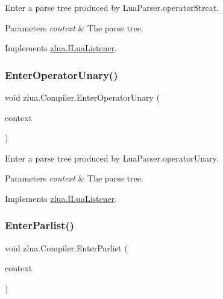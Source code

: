 Enter a parse tree produced by Lua\+Parser.\+operator\+Strcat. 


\begin{DoxyParams}{Parameters}
{\em context} & The parse tree.\\
\hline
\end{DoxyParams}


Implements \mbox{\hyperlink{interfacezlua_1_1_i_lua_listener_a9fbd70b572afa004220c8cdcaceb641a}{zlua.\+I\+Lua\+Listener}}.

\mbox{\label{classzlua_1_1_compiler_a1c085d48a4bc63b7b42cb8763f643bb2}} 
\subsubsection{\texorpdfstring{Enter\+Operator\+Unary()}{EnterOperatorUnary()}}
{\footnotesize\ttfamily void zlua.\+Compiler.\+Enter\+Operator\+Unary (\begin{DoxyParamCaption}\item[{\mbox{[}\+Not\+Null\mbox{]} \mbox{\hyperlink{classzlua_1_1_lua_parser_1_1_operator_unary_context}{Lua\+Parser.\+Operator\+Unary\+Context}}}]{context }\end{DoxyParamCaption})}



Enter a parse tree produced by Lua\+Parser.\+operator\+Unary. 


\begin{DoxyParams}{Parameters}
{\em context} & The parse tree.\\
\hline
\end{DoxyParams}


Implements \mbox{\hyperlink{interfacezlua_1_1_i_lua_listener_a7b7f6eceb594a19cd7ee783bdb209c8e}{zlua.\+I\+Lua\+Listener}}.

\mbox{\label{classzlua_1_1_compiler_a6cca7cfa803b7be16090f38ffd6b7186}} 
\subsubsection{\texorpdfstring{Enter\+Parlist()}{EnterParlist()}}
{\footnotesize\ttfamily void zlua.\+Compiler.\+Enter\+Parlist (\begin{DoxyParamCaption}\item[{\mbox{[}\+Not\+Null\mbox{]} \mbox{\hyperlink{classzlua_1_1_lua_parser_1_1_parlist_context}{Lua\+Parser.\+Parlist\+Context}}}]{context }\end{DoxyParamCaption})}



